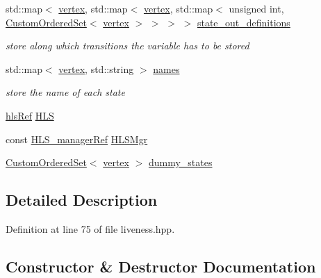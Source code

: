 \begin{DoxyCompactItemize}
std\+::map$<$ \hyperlink{graph_8hpp_abefdcf0544e601805af44eca032cca14}{vertex}, std\+::map$<$ \hyperlink{graph_8hpp_abefdcf0544e601805af44eca032cca14}{vertex}, std\+::map$<$ unsigned int, \hyperlink{classCustomOrderedSet}{Custom\+Ordered\+Set}$<$ \hyperlink{graph_8hpp_abefdcf0544e601805af44eca032cca14}{vertex} $>$ $>$ $>$ $>$ \hyperlink{classliveness_a282db1a864b07567b4300fc71f6cf4c4}{state\+\_\+out\+\_\+definitions}
\begin{DoxyCompactList}\small\item\em store along which transitions the variable has to be stored \end{DoxyCompactList}\item 
std\+::map$<$ \hyperlink{graph_8hpp_abefdcf0544e601805af44eca032cca14}{vertex}, std\+::string $>$ \hyperlink{classliveness_aa770d60851e188464b2768027804c3bb}{names}
\begin{DoxyCompactList}\small\item\em store the name of each state \end{DoxyCompactList}\item 
\hyperlink{hls_8hpp_a75d0c73923d0ddfa28c4843a802c73a7}{hls\+Ref} \hyperlink{classliveness_af5e5e69f36b104fc3f335881cdc0ac77}{H\+LS}
\item 
const \hyperlink{hls__manager_8hpp_acd3842b8589fe52c08fc0b2fcc813bfe}{H\+L\+S\+\_\+manager\+Ref} \hyperlink{classliveness_a95836be57bfe30a8957942c76dd489a9}{H\+L\+S\+Mgr}
\item 
\hyperlink{classCustomOrderedSet}{Custom\+Ordered\+Set}$<$ \hyperlink{graph_8hpp_abefdcf0544e601805af44eca032cca14}{vertex} $>$ \hyperlink{classliveness_a0f2ac91d8d96d6865b29860e726fde00}{dummy\+\_\+states}
\end{DoxyCompactItemize}


\subsection{Detailed Description}


Definition at line 75 of file liveness.\+hpp.



\subsection{Constructor \& Destructor Documentation}
\mbox{\label{classliveness_a6b677572ebda4ba84035251bf3e8353b}} 
